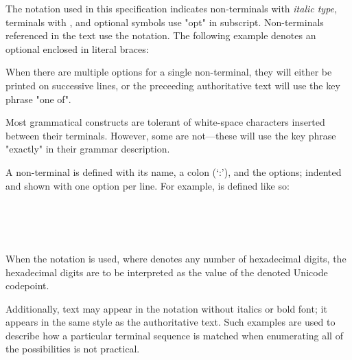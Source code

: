 


\specsubitem
The notation used in this specification indicates non-terminals with
\textit{italic type}, terminals with , and optional
symbols use "opt" in subscript. Non-terminals referenced in the text use the
 notation. The following example denotes an optional
 enclosed in literal braces:

\begin{grammar}
\terminal{\{}  \terminal{\}}
\end{grammar}

\specsubitem
When there are multiple options for a single non-terminal, they will either be
printed on successive lines, or the preceeding authoritative text will use the
key phrase "one of".

\specsubitem
Most grammatical constructs are tolerant of white-space characters inserted
between their terminals. However, some are not---these will use the key
phrase "exactly" in their grammar description.

\specsubitem
A non-terminal is defined with its name, a colon (`:'), and the options;
indented and shown with one option per line. For example,
 is defined like so:

\begin{grammar}
 \\
	 \terminal{;} \\
	 \terminal{;}  \\
\end{grammar}

\specsubitem
When the  notation is used, where  denotes any number of
hexadecimal digits, the hexadecimal digits are to be interpreted as the value of
the denoted Unicode codepoint.


\specsubitem
Additionally, text may appear in the notation without italics or bold font; it
appears in the same style as the authoritative text. Such examples are used to
describe how a particular terminal sequence is matched when enumerating all of
the possibilities is not practical.

\begin{grammar}
 \\
	 \\
\end{grammar}







